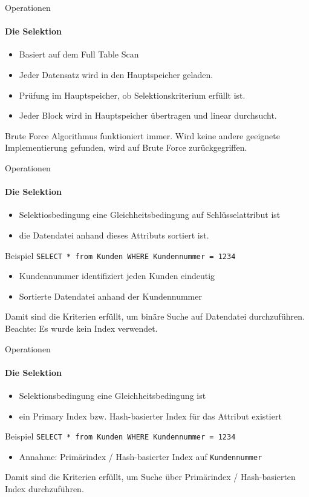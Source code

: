 \begin{frame}[fragile]{Operationen}
\framesubtitle{Die Selektion}
\begin{itemize}
	\item Basiert auf dem Full Table Scan
	\pause
	\item Jeder Datensatz wird in den Hauptspeicher geladen.
	\pause
	\item Pr\"ufung im Hauptspeicher, ob Selektionskriterium erfüllt ist. 
	\pause
	\item Jeder Block wird in Hauptspeicher übertragen und linear durchsucht.
\end{itemize}
\abs
Brute Force Algorithmus funktioniert immer. 
\nl
Wird keine andere geeignete Implementierung gefunden, wird auf Brute Force zurückgegriffen. 
\end{frame}

\begin{frame}[fragile]{Operationen}
\framesubtitle{Die Selektion}
\abs
{}
\begin{itemize}
	\item Selektiosbedingung eine Gleichheitsbedingung auf Schlüsselattribut ist 
	\item die Datendatei anhand dieses Attributs sortiert ist.
\end{itemize}
\abs
\begin{block}{Beispiel}
\texttt{SELECT * from Kunden WHERE Kundennummer = 1234}
\begin{itemize}
\item Kundennummer identifiziert jeden Kunden eindeutig
\item Sortierte Datendatei anhand der Kundennummer 
\end{itemize}
\end{block}
Damit sind die Kriterien erfüllt, um binäre Suche auf Datendatei durchzuführen. 
\nl 
Beachte: Es wurde kein Index verwendet.
\end{frame}

\begin{frame}[fragile]{Operationen}
\framesubtitle{Die Selektion}
\abs
{}
\begin{itemize}
	\item Selektionsbedingung eine Gleichheitsbedingung ist  
	\item ein Primary Index bzw. Hash-basierter Index für das Attribut existiert
\end{itemize}
\abs
\begin{block}{Beispiel}
\texttt{SELECT * from Kunden WHERE Kundennummer = 1234}
\begin{itemize}
\item Annahme: Prim\"arindex / Hash-basierter Index auf \texttt{Kundennummer}
\end{itemize}
\end{block}
Damit sind die Kriterien erfüllt, um Suche über Prim\"arindex / Hash-basierten Index durchzuführen.
\end{frame}

